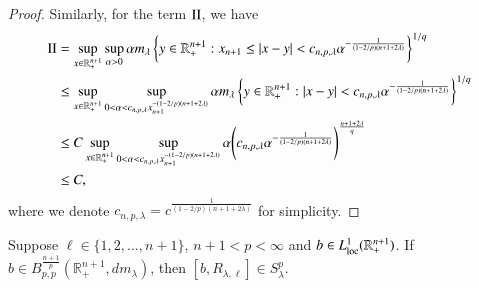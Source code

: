 \documentclass[12pt]{amsart}
\begin{document}
\begin{proof}
Similarly, for the term ${\rm II}$,  we have
\begin{align*}
{\rm II}&=\sup\limits_{x\in\mathbb{R}_+^{n+1}}\sup\limits_{\alpha>0}\alpha m_\lambda\left\{y\in\mathbb{R}_+^{n+1}:x_{n+1}\leq |x-y|<c_{n,p,\lambda}\alpha^{-\frac{1}{(1-2/p)(n+1+2\lambda)}}\right\}^{1/q}\\
&\leq\sup\limits_{x\in\mathbb{R}_+^{n+1}}\sup\limits_{0<\alpha<c_{n,p,\lambda}x_{n+1}^{-(1-2/p)(n+1+2\lambda)}}\alpha m_\lambda\left\{y\in\mathbb{R}_+^{n+1}: |x-y|<c_{n,p,\lambda}\alpha^{-\frac{1}{(1-2/p)(n+1+2\lambda)}}\right\}^{1/q}\\
&\leq C\sup\limits_{x\in\mathbb{R}_+^{n+1}}\sup\limits_{0<\alpha<c_{n,p,\lambda}x_{n+1}^{-(1-2/p)(n+1+2\lambda)}}\alpha \Bigg(c_{n,p,\lambda}\alpha^{-\frac{1}{(1-2/p)(n+1+2\lambda)}}\Bigg)^{\frac{n+1+2\lambda}{q}}\\
&\leq C,
\end{align*}
where we denote $c_{n,p,\lambda}=c^{\frac{1}{(1-2/p)(n+1+2\lambda)}}$ for simplicity.
\end{proof}
\begin{proposition}\label{schattenlarge2}
Suppose $\ell\in \{1,2,\ldots,n+1\}$, $n+1<p<\infty$ and $b\in L_{\rm loc}^1(\mathbb{R}_{+}^{n+1})$. If  $b\in B_{p,p}^{\frac{n+1}{p}}(\mathbb R_+^{n+1},dm_\lambda)$, then $[b,R_{\lambda,\ell}]\in S_\lambda^p$.
\end{proposition}
\end{document}
